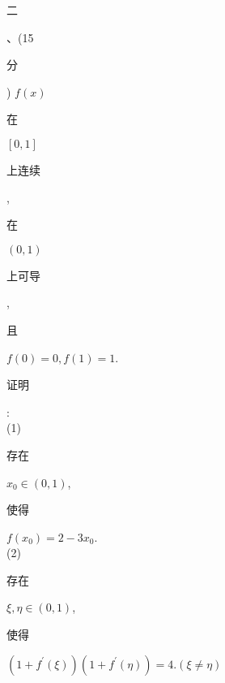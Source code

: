 \documentclass[10pt]{article}
\begin{document}
\begin{CJK}{UTF8}{mj}二\end{CJK}、(15 \begin{CJK}{UTF8}{mj}分\end{CJK}) $f(x)$ \begin{CJK}{UTF8}{mj}在\end{CJK} $[0,1]$ \begin{CJK}{UTF8}{mj}上连续\end{CJK}, \begin{CJK}{UTF8}{mj}在\end{CJK} $(0,1)$ \begin{CJK}{UTF8}{mj}上可导\end{CJK}, \begin{CJK}{UTF8}{mj}且\end{CJK} $f(0)=0, f(1)=1$. \begin{CJK}{UTF8}{mj}证明\end{CJK}:\\
(1) \begin{CJK}{UTF8}{mj}存在\end{CJK} $x_{0} \in(0,1)$, \begin{CJK}{UTF8}{mj}使得\end{CJK} $f\left(x_{0}\right)=2-3 x_{0}$.\\
(2) \begin{CJK}{UTF8}{mj}存在\end{CJK} $\xi, \eta \in(0,1)$, \begin{CJK}{UTF8}{mj}使得\end{CJK} $\left(1+f^{\prime}(\xi)\right)\left(1+f^{\prime}(\eta)\right)=4 .(\xi \neq \eta)$
\end{document}
